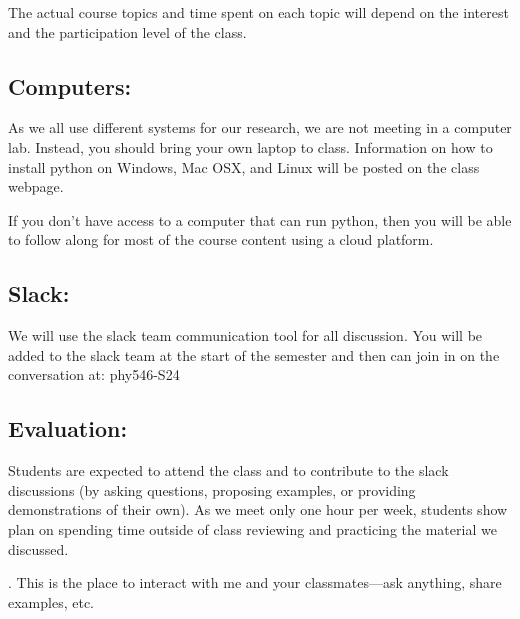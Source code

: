 \documentclass[10pt]{article}
\begin{document}
\noindent The actual course topics and time spent on each topic will depend on the
interest and the participation level of the class.


\subsection*{Computers:}
%
As we all use different systems for our research, we are not meeting
in a computer lab.  Instead, you should bring your own laptop to
class.  Information on how to install python on Windows, Mac OSX, and
Linux will be posted on the class webpage.

\noindent
If you don't have access to a computer that can run python, then you will be
able to follow along for most of the course content using a cloud platform.


\subsection*{Slack:}
%
We will use the slack team communication tool for all discussion.  You
will be added to the slack team at the start of the semester and then
can join in on the conversation at: {\sf phy546-S24}


\subsection*{Evaluation:}

Students are expected to attend the class and to contribute
to the slack discussions (by asking questions, proposing examples, or
providing demonstrations of their own).  As we meet only one hour per
week, students show plan on spending time outside of class reviewing
and practicing the material we discussed.

.  This is the place to interact with
me and your classmates---ask anything, share examples, etc.
\end{document}
